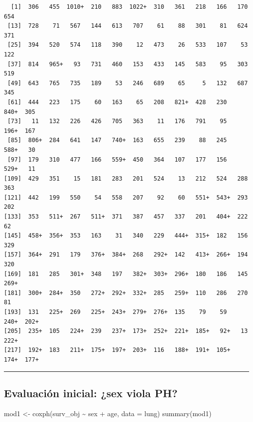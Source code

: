 \documentclass[
]{article}
\newenvironment{Shaded}{\begin{snugshade}}{\end{snugshade}}
\newcommand{\AttributeTok}[1]{\textcolor[rgb]{0.40,0.45,0.13}{#1}}
\newcommand{\FunctionTok}[1]{\textcolor[rgb]{0.28,0.35,0.67}{#1}}
\newcommand{\NormalTok}[1]{\textcolor[rgb]{0.00,0.23,0.31}{#1}}
\newcommand{\OtherTok}[1]{\textcolor[rgb]{0.00,0.23,0.31}{#1}}
\newcommand{\SpecialCharTok}[1]{\textcolor[rgb]{0.37,0.37,0.37}{#1}}
\begin{document}
\begin{verbatim}
  [1]  306   455  1010+  210   883  1022+  310   361   218   166   170   654 
 [13]  728    71   567   144   613   707    61    88   301    81   624   371 
 [25]  394   520   574   118   390    12   473    26   533   107    53   122 
 [37]  814   965+   93   731   460   153   433   145   583    95   303   519 
 [49]  643   765   735   189    53   246   689    65     5   132   687   345 
 [61]  444   223   175    60   163    65   208   821+  428   230   840+  305 
 [73]   11   132   226   426   705   363    11   176   791    95   196+  167 
 [85]  806+  284   641   147   740+  163   655   239    88   245   588+   30 
 [97]  179   310   477   166   559+  450   364   107   177   156   529+   11 
[109]  429   351    15   181   283   201   524    13   212   524   288   363 
[121]  442   199   550    54   558   207    92    60   551+  543+  293   202 
[133]  353   511+  267   511+  371   387   457   337   201   404+  222    62 
[145]  458+  356+  353   163    31   340   229   444+  315+  182   156   329 
[157]  364+  291   179   376+  384+  268   292+  142   413+  266+  194   320 
[169]  181   285   301+  348   197   382+  303+  296+  180   186   145   269+
[181]  300+  284+  350   272+  292+  332+  285   259+  110   286   270    81 
[193]  131   225+  269   225+  243+  279+  276+  135    79    59   240+  202+
[205]  235+  105   224+  239   237+  173+  252+  221+  185+   92+   13   222+
[217]  192+  183   211+  175+  197+  203+  116   188+  191+  105+  174+  177+
\end{verbatim}

\begin{center}\rule{0.5\linewidth}{0.5pt}\end{center}

\subsection{Evaluación inicial: ¿sex viola
PH?}\label{evaluaciuxf3n-inicial-sex-viola-ph}

\begin{Shaded}
\begin{Highlighting}[]
\NormalTok{mod1 }\OtherTok{\textless{}{-}} \FunctionTok{coxph}\NormalTok{(surv\_obj }\SpecialCharTok{\textasciitilde{}}\NormalTok{ sex }\SpecialCharTok{+}\NormalTok{ age, }\AttributeTok{data =}\NormalTok{ lung)}
\FunctionTok{summary}\NormalTok{(mod1)}
\end{Highlighting}
\end{Shaded}
\end{document}
